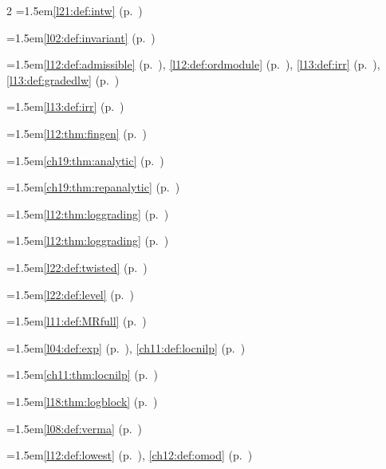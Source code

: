 \begin{multicols}{2}
\hangindent=1.5em\quad \ref{l21:def:intw} (p.~\pageref{l21:def:intw})\par
\hangindent=1.5em\quad \ref{l02:def:invariant} (p.~\pageref{l02:def:invariant})\par
\hangindent=1.5em\quad \ref{l12:def:admissible} (p.~\pageref{l12:def:admissible}), \ref{l12:def:ordmodule} (p.~\pageref{l12:def:ordmodule}), \ref{l13:def:irr} (p.~\pageref{l13:def:irr}), \ref{l13:def:gradedlw} (p.~\pageref{l13:def:gradedlw})\par
\hangindent=1.5em\quad \ref{l13:def:irr} (p.~\pageref{l13:def:irr})\par
\hangindent=1.5em\quad \ref{l12:thm:fingen} (p.~\pageref{l12:thm:fingen})\par
\hangindent=1.5em\quad \ref{ch19:thm:analytic} (p.~\pageref{ch19:thm:analytic})\par
\hangindent=1.5em\quad \ref{ch19:thm:repanalytic} (p.~\pageref{ch19:thm:repanalytic})\par
\hangindent=1.5em\quad \ref{l12:thm:loggrading} (p.~\pageref{l12:thm:loggrading})\par
\hangindent=1.5em\quad \ref{l12:thm:loggrading} (p.~\pageref{l12:thm:loggrading})\par
\hangindent=1.5em\quad \ref{l22:def:twisted} (p.~\pageref{l22:def:twisted})\par
\hangindent=1.5em\quad \ref{l22:def:level} (p.~\pageref{l22:def:level})\par
\hangindent=1.5em\quad \ref{l11:def:MRfull} (p.~\pageref{l11:def:MRfull})\par
\hangindent=1.5em\quad \ref{l04:def:exp} (p.~\pageref{l04:def:exp}), \ref{ch11:def:locnilp} (p.~\pageref{ch11:def:locnilp})\par
\hangindent=1.5em\quad \ref{ch11:thm:locnilp} (p.~\pageref{ch11:thm:locnilp})\par
\hangindent=1.5em\quad \ref{l18:thm:logblock} (p.~\pageref{l18:thm:logblock})\par
\hangindent=1.5em\quad \ref{l08:def:verma} (p.~\pageref{l08:def:verma})\par
\hangindent=1.5em\quad \ref{l12:def:lowest} (p.~\pageref{l12:def:lowest}), \ref{ch12:def:omod} (p.~\pageref{ch12:def:omod})\par

\end{multicols}
